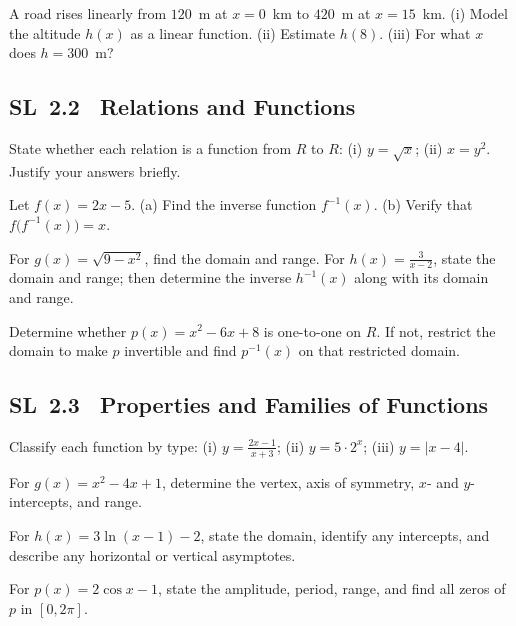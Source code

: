\documentclass[11pt]{article}
\def\mathbb#1{#1}%
\newcommand{\tocsubsection}[1]{\subsection{#1}}
\newcounter{question}
\begin{document}
\begin{question}
A road rises linearly from $120$ m at $x=0$ km to $420$ m at $x=15$ km.
(i) Model the altitude $h(x)$ as a linear function.  (ii) Estimate $h(8)$.
(iii) For what $x$ does $h=300$ m?
\end{question}

\tocsubsection{SL 2.2 \; Relations and Functions}

\begin{question}
State whether each relation is a function from $\mathbb{R}$ to $\mathbb{R}$:
(i) $y=\sqrt{x}$; (ii) $x=y^2$.  Justify your answers briefly.
\end{question}

\begin{question}
Let $f(x)=2x-5$.  (a) Find the inverse function $f^{-1}(x)$.  (b) Verify that
$f\bigl(f^{-1}(x)\bigr)=x$.
\end{question}

\begin{question}
For $g(x)=\sqrt{9-x^2}$, find the domain and range.  For $h(x)=\frac{3}{x-2}$,
state the domain and range; then determine the inverse $h^{-1}(x)$ along with
its domain and range.
\end{question}

\begin{question}
Determine whether $p(x)=x^2-6x+8$ is one-to-one on $\mathbb{R}$.  If not,
restrict the domain to make $p$ invertible and find $p^{-1}(x)$ on that
restricted domain.
\end{question}

\tocsubsection{SL 2.3 \; Properties and Families of Functions}

\begin{question}
Classify each function by type: (i) $y=\tfrac{2x-1}{x+3}$; (ii) $y=5\cdot2^x$;
(iii) $y=|x-4|$.
\end{question}

\begin{question}
For $g(x)=x^2-4x+1$, determine the vertex, axis of symmetry, $x$- and
$y$-intercepts, and range.
\end{question}

\begin{question}
For $h(x)=3\ln(x-1)-2$, state the domain, identify any intercepts, and describe
any horizontal or vertical asymptotes.
\end{question}

\begin{question}
For $p(x)=2\cos x-1$, state the amplitude, period, range, and find all zeros of
$p$ in $[0,2\pi]$.
\end{question}
\end{document}
